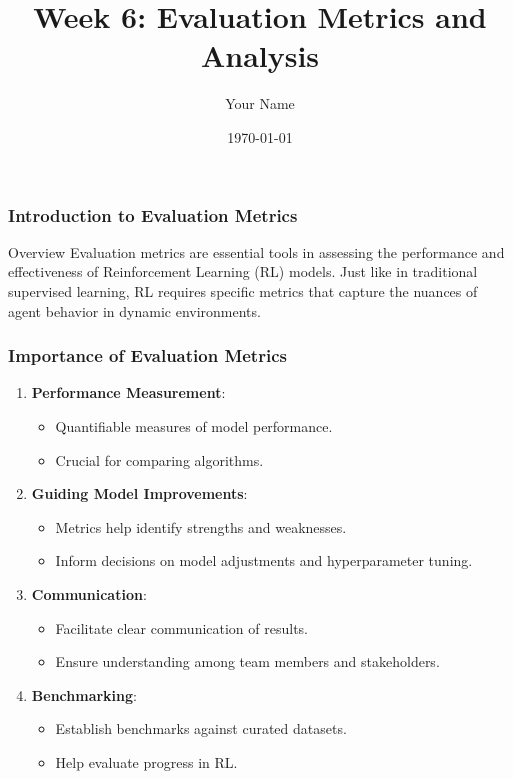 \documentclass{beamer}
\title{Week 6: Evaluation Metrics and Analysis}
\author{Your Name}
\institute{Your Institution}
\date{\today}
\begin{document}
\frame{\titlepage}

\begin{frame}[fragile]
    \frametitle{Introduction to Evaluation Metrics}
    \begin{block}{Overview}
        Evaluation metrics are essential tools in assessing the performance and effectiveness of Reinforcement Learning (RL) models.
        Just like in traditional supervised learning, RL requires specific metrics that capture the nuances of agent behavior in dynamic environments.
    \end{block}
\end{frame}

\begin{frame}[fragile]
    \frametitle{Importance of Evaluation Metrics}
    \begin{enumerate}
        \item \textbf{Performance Measurement}:
        \begin{itemize}
            \item Quantifiable measures of model performance.
            \item Crucial for comparing algorithms.
        \end{itemize}

        \item \textbf{Guiding Model Improvements}:
        \begin{itemize}
            \item Metrics help identify strengths and weaknesses.
            \item Inform decisions on model adjustments and hyperparameter tuning.
        \end{itemize}

        \item \textbf{Communication}:
        \begin{itemize}
            \item Facilitate clear communication of results.
            \item Ensure understanding among team members and stakeholders.
        \end{itemize}
        
        \item \textbf{Benchmarking}:
        \begin{itemize}
            \item Establish benchmarks against curated datasets.
            \item Help evaluate progress in RL.
        \end{itemize}
    \end{enumerate}
\end{frame}
\end{document}
